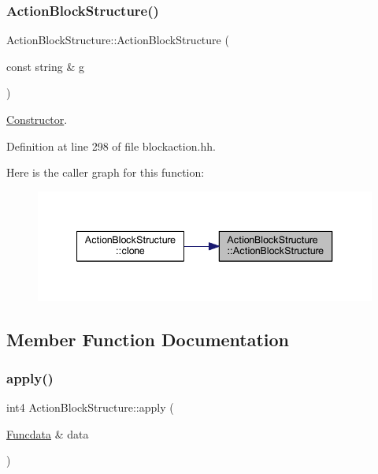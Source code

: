 \subsubsection{\texorpdfstring{ActionBlockStructure()}{ActionBlockStructure()}}
{\footnotesize\ttfamily Action\+Block\+Structure\+::\+Action\+Block\+Structure (\begin{DoxyParamCaption}\item[{const string \&}]{g }\end{DoxyParamCaption})\hspace{0.3cm}{\ttfamily [inline]}}



\mbox{\hyperlink{class_constructor}{Constructor}}. 



Definition at line 298 of file blockaction.\+hh.

Here is the caller graph for this function\+:
\nopagebreak
\begin{figure}[H]
\begin{center}
\leavevmode
\includegraphics[width=340pt]{class_action_block_structure_ab7a8efa0c54dc3ca5b42d7dc4ca23121_icgraph}
\end{center}
\end{figure}


\subsection{Member Function Documentation}
\mbox{\label{class_action_block_structure_a59e5e7c8f0d703b778d06e2e6373cd27}} 
\subsubsection{\texorpdfstring{apply()}{apply()}}
{\footnotesize\ttfamily int4 Action\+Block\+Structure\+::apply (\begin{DoxyParamCaption}\item[{\mbox{\hyperlink{class_funcdata}{Funcdata}} \&}]{data }\end{DoxyParamCaption})\hspace{0.3cm}{\ttfamily [virtual]}}



